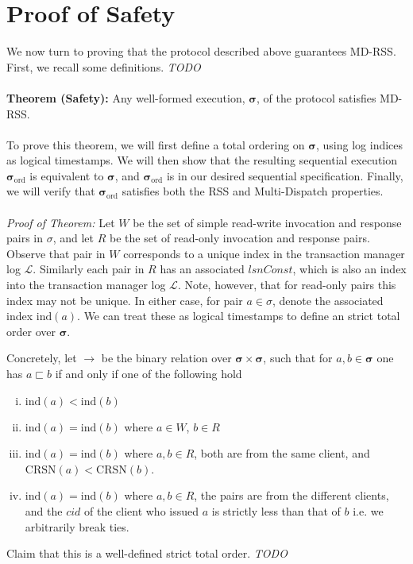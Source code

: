 \documentclass{article}
\begin{document}
\section{Proof of Safety}
We now turn to proving that the protocol described above guarantees MD-RSS. First, we recall some definitions. \textit{TODO}
\\\\
\textbf{Theorem (Safety):} Any well-formed execution, $\pmb{\sigma}$, of the protocol satisfies MD-RSS. 
\\\\
To prove this theorem, we will first define a total ordering on $\pmb{\sigma}$, using log indices as logical timestamps. We will then show that the resulting sequential execution $\pmb{\sigma}_{\text{ord}}$ is equivalent to $\pmb{\sigma}$, and $\pmb{\sigma}_{\text{ord}}$ is in our desired sequential specification. Finally, we will verify that $\pmb{\sigma}_{\text{ord}}$ satisfies both the RSS and Multi-Dispatch properties. \\\\
\textit{Proof of Theorem:} Let $W$ be the set of simple read-write invocation and response pairs in $\sigma$, and let $R$ be the set of read-only invocation and response pairs. 
Observe that pair in $W$ corresponds to a unique index in the transaction manager log $\mathcal{L}$. Similarly each pair in $R$ has an associated $lsnConst$, which is also an index into the transaction manager log $\mathcal{L}$. Note, however, that for read-only pairs this index may not be unique. In either case, for pair $a\in \sigma$, denote the associated index $\text{ind}(a)$. We can treat these as logical timestamps to define an strict total order over $\pmb{\sigma}$. 
\par Concretely, let $\rightarrow$ be the binary relation over $\pmb{\sigma} \times \pmb{\sigma}$, such that for $a, b \in \pmb{\sigma}$ one has $a \sqsubset b$ if and only if one of the following hold
\begin{enumerate}[i.)]
\item $\text{ind}(a) < \text{ind}(b)$
\item $\text{ind}(a) = \text{ind}(b)$ where $a \in W$, $b \in R$
\item $\text{ind}(a) = \text{ind}(b)$ where $a, b \in R$, both are from the same client, and $\text{CRSN}(a)< \text{CRSN}(b)$.
\item $\text{ind}(a) = \text{ind}(b)$ where $a, b \in R$, the pairs are from the different clients, and the $cid$ of the client who issued $a$ is strictly less than that of $b$ i.e. we arbitrarily break ties. 
\end{enumerate}
Claim that this is a well-defined strict total order. \textit{TODO}
\end{document}
